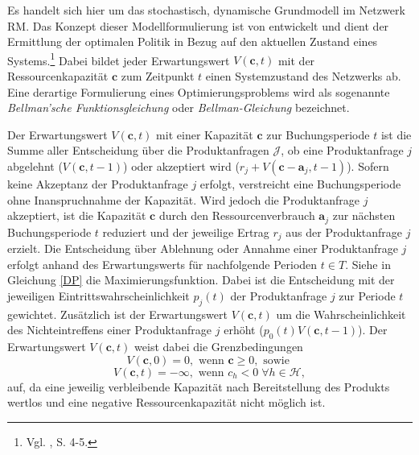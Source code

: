 Es handelt sich hier um das stochastisch, dynamische Grundmodell im Netzwerk RM. Das Konzept dieser Modellformulierung ist von \citeauthor{bellman1954theory} entwickelt und dient der Ermittlung der optimalen Politik in Bezug auf den aktuellen Zustand eines Systems.\footnote{Vgl. \cite{bellman1954theory}, S. 4-5.} Dabei bildet jeder Erwartungswert $V(\textbf{c},t)$ mit der Ressourcenkapazität $\textbf{c}$ zum Zeitpunkt $t$ einen Systemzustand des Netzwerks ab. Eine derartige Formulierung eines Optimierungsproblems wird als sogenannte \textit{Bellman'sche Funktionsgleichung} oder \textit{Bellman-Gleichung} bezeichnet.

Der Erwartungswert $V(\textbf{c},t)$ mit einer Kapazität $\textbf{c}$ zur Buchungsperiode $t$ ist die Summe aller Entscheidung über die Produktanfragen $\mathcal{J}$, ob eine Produktanfrage $j$ abgelehnt ($V(\textbf{c},t-1)$) oder akzeptiert wird ($r_{j}+V(\textbf{c}-\textbf{a}_{j},t-1)$). Sofern keine Akzeptanz der Produktanfrage $j$ erfolgt, verstreicht eine Buchungsperiode ohne Inanspruchnahme der Kapazität. Wird jedoch die Produktanfrage $j$ akzeptiert, ist die Kapazität $\textbf{c}$ durch den Ressourcenverbrauch $\textbf{a}_j$ zur nächsten Buchungsperiode $t$ reduziert und der jeweilige Ertrag $r_j$ aus der Produktanfrage $j$ erzielt. Die Entscheidung über Ablehnung oder Annahme einer Produktanfrage $j$ erfolgt anhand des Erwartungswerts für nachfolgende Perioden $t\in T$. Siehe in Gleichung \eqref{DP} die Maximierungsfunktion. Dabei ist die Entscheidung mit der jeweiligen Eintrittswahrscheinlichkeit $p_j(t)$ der Produktanfrage $j$ zur Periode $t$ gewichtet. Zusätzlich ist der Erwartungswert $V(\textbf{c},t)$ um die Wahrscheinlichkeit des Nichteintreffens einer Produktanfrage $j$ erhöht ($p_{0}(t)V(\textbf{c},t-1)$). Der Erwartungswert $V(\textbf{c},t)$ weist dabei die Grenzbedingungen
\begin{equation}\label{GB1}
V(\textbf{c},0)=0, \text{ wenn } \textbf{c}\ge0, \text{ sowie }
\end{equation}
\begin{equation}\label{GB2}
V(\textbf{c},t)=-\infty, \text{ wenn } c_{h}<0 \;\forall h\in\mathcal{H},
\end{equation}
auf, da eine jeweilig verbleibende Kapazität nach Bereitstellung des Produkts wertlos und eine negative Ressourcenkapazität nicht möglich ist. 

